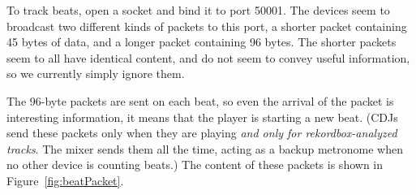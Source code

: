 \documentclass[11pt]{article}
\begin{document}
To track beats, open a socket and bind it to port 50001. The devices
seem to broadcast two different kinds of packets to this port, a
shorter packet containing 45 bytes of data, and a longer packet
containing 96 bytes. The shorter packets seem to all have identical
content, and do not seem to convey useful information, so we currently
simply ignore them.

The 96-byte packets are sent on each beat, so even the arrival of the
packet is interesting information, it means that the player is
starting a new beat. (CDJs send these packets only when they are
playing \emph{and only for rekordbox-analyzed tracks}. The mixer sends
them all the time, acting as a backup metronome when no other device
is counting beats.) The content of these packets is shown in
Figure~\ref{fig:beatPacket}.
\end{document}
